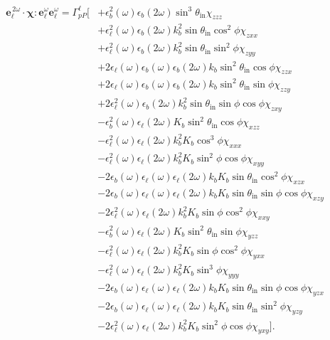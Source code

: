 \begin{equation*}
\begin{split}
\mathbf{e}^{\,2\omega}_{\ell}\cdot
\boldsymbol{\chi}:\mathbf{e}^{\omega}_{\ell}\mathbf{e}^{\omega}_{\ell} =
\Gamma^{\ell}_{pP}
\big[
&+ \epsilon_{b}^{2}(\omega)\epsilon_{b}(2\omega)
   \sin^{3}\theta_{\mathrm{in}}\chi_{zzz}\\
&+ \epsilon_{\ell}^{2}(\omega)\epsilon_{b}(2\omega)k^{2}_{b}
   \sin\theta_{\mathrm{in}}\cos^{2}\phi\chi_{zxx}\\
&+ \epsilon_{\ell}^{2}(\omega)\epsilon_{b}(2\omega)k^{2}_{b}
   \sin\theta_{\mathrm{in}}\sin^{2}\phi\chi_{zyy}\\
&+ 2\epsilon_{\ell}(\omega)\epsilon_{b}(\omega)\epsilon_{b}(2\omega)k_{b}
   \sin^{2}\theta_{\mathrm{in}}\cos\phi\chi_{zzx}\\
&+ 2\epsilon_{\ell}(\omega)\epsilon_{b}(\omega)\epsilon_{b}(2\omega)k_{b}
   \sin^{2}\theta_{\mathrm{in}}\sin\phi\chi_{zzy}\\
&+ 2\epsilon^{2}_{\ell}(\omega)\epsilon_{b}(2\omega)k^{2}_{b}
   \sin\theta_{\mathrm{in}}\sin\phi\cos\phi\chi_{zxy}\\
&- \epsilon_{b}^{2}(\omega)\epsilon_{\ell}(2\omega)K_{b}
   \sin^{2}\theta_{\mathrm{in}}\cos\phi\chi_{xzz}\\
&- \epsilon_{\ell}^{2}(\omega)\epsilon_{\ell}(2\omega)k^{2}_{b}K_{b}
   \cos^{3}\phi\chi_{xxx}\\
&- \epsilon_{\ell}^{2}(\omega)\epsilon_{\ell}(2\omega)k^{2}_{b}K_{b}
   \sin^{2}\phi\cos\phi\chi_{xyy}\\
&- 2\epsilon_{b}(\omega)\epsilon_{\ell}(\omega)\epsilon_{\ell}(2\omega)k_{b}K_{b}
   \sin\theta_{\mathrm{in}}\cos^{2}\phi\chi_{xzx}\\
&- 2\epsilon_{b}(\omega)\epsilon_{\ell}(\omega)\epsilon_{\ell}(2\omega)k_{b}K_{b}
   \sin\theta_{\mathrm{in}}\sin\phi\cos\phi\chi_{xzy}\\
&- 2\epsilon^{2}_{\ell}(\omega)\epsilon_{\ell}(2\omega)k^{2}_{b}K_{b}
   \sin\phi\cos^{2}\phi\chi_{xxy}\\
&- \epsilon_{b}^{2}(\omega)\epsilon_{\ell}(2\omega)K_{b}
   \sin^{2}\theta_{\mathrm{in}}\sin\phi\chi_{yzz}\\
&- \epsilon_{\ell}^{2}(\omega)\epsilon_{\ell}(2\omega)k^{2}_{b}K_{b}
   \sin\phi\cos^{2}\phi\chi_{yxx}\\
&- \epsilon_{\ell}^{2}(\omega)\epsilon_{\ell}(2\omega)k^{2}_{b}K_{b}
   \sin^{3}\phi\chi_{yyy}\\
&- 2\epsilon_{b}(\omega)\epsilon_{\ell}(\omega)\epsilon_{\ell}(2\omega)k_{b}K_{b}
   \sin\theta_{\mathrm{in}}\sin\phi\cos\phi\chi_{yzx}\\
&- 2\epsilon_{b}(\omega)\epsilon_{\ell}(\omega)\epsilon_{\ell}(2\omega)k_{b}K_{b}
   \sin\theta_{\mathrm{in}}\sin^{2}\phi\chi_{yzy}\\
&- 2\epsilon^{2}_{\ell}(\omega)\epsilon_{\ell}(2\omega)k^{2}_{b}K_{b}
   \sin^{2}\phi\cos\phi\chi_{yxy}
\big].
\end{split}
\end{equation*}
